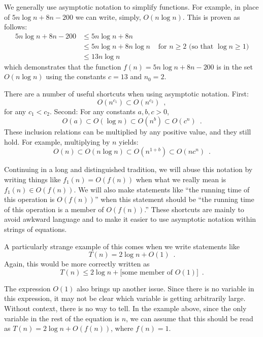 We generally use asymptotic notation to simplify functions.  For example,
in place of $5n\log n + 8n - 200$ we can write, simply,  $O(n\log n)$.
This is proven as follows:
\begin{align*} 
       5n\log n + 8n - 200
        & \le 5n\log n + 8n \\
        & \le 5n\log n + 8n\log n & \mbox{ for $n\ge 2$ (so that $\log n \ge 1$)}
            \\
        & \le 13n\log n 
\end{align*}
which demonstrates that the function $f(n)=5n\log n + 8n - 200$ is in the set $O(n\log n)$ using the constants $c=13$ and $n_0 = 2$.

There are a number of useful shortcuts when using asymptotic notation.  First:
\[ O(n^{c_1}) \subset O(n^{c_2}) \enspace ,\]
for any $c_1 < c_2$.  Second: For any constants $a,b,c > 0$,
\[ O(a) \subset O(\log n) \subset O(n^{b}) \subset O({c}^n) \enspace . \]
These inclusion relations can be multiplied by any positive value,
and they still hold. For example, multiplying by $n$ yields:
\[ O(n) \subset O(n\log n) \subset O(n^{1+b}) \subset O(n{c}^n) \enspace . \]

Continuing in a long and distinguished tradition, we will abuse this
notation by writing things like $f_1(n) = O(f(n))$ when what we really
mean is $f_1(n) \in O(f(n))$.  We will also make statements like ``the
running time of this operation is $O(f(n))$'' when this statement should
be ``the running time of this operation is a member of $O(f(n))$.''
These shortcuts are mainly to avoid awkward language and to make it
easier to use asymptotic notation within strings of equations.

A particularly strange example of this comes when we write statements like
\[
  T(n) = 2\log n + O(1)  \enspace .
\]
Again, this would be more correctly written as
\[
  T(n) \le 2\log n + [\mbox{some member of $O(1)$]}  \enspace .
\]

The expression $O(1)$ also brings up another issue. Since there is
no variable in this expression, it may not be clear which variable is
getting arbitrarily large.  Without context, there is no way to tell.
In the example above, since the only variable in the rest of the equation
is $n$, we can assume that this should be read as $T(n) = 2\log n +
O(f(n))$, where $f(n) = 1$.

